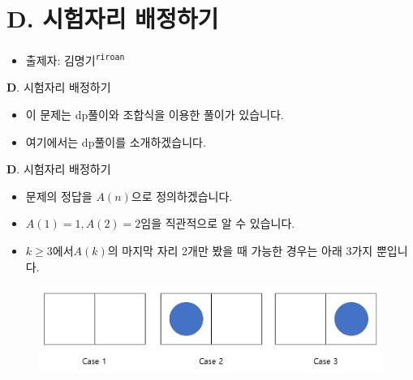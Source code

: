 \section{D. 시험자리 배정하기}

\begin{frame} %
    \begin{itemize}
        \item 출제자: 김명기\textsuperscript{\color{kupc-gray}\texttt{riroan}}
    \end{itemize}
\end{frame}

\begin{frame}{\textbf{D}. 시험자리 배정하기}

    \begin{itemize}
    	\item 이 문제는 dp풀이와 조합식을 이용한 풀이가 있습니다.
    	\item 여기에서는 dp풀이를 소개하겠습니다.
    \end{itemize}
    
\end{frame}


\begin{frame}{\textbf{D}. 시험자리 배정하기}
	
	\begin{itemize}
		\item 문제의 정답을 $A(n)$으로 정의하겠습니다.
		\item $A(1) = 1, A(2) = 2$임을 직관적으로 알 수 있습니다.
		\item $k \ge 3$에서$A(k)$의 마지막 자리 2개만 봤을 때 가능한 경우는 아래 3가지 뿐입니다.

	\end{itemize}
	\begin{figure}[h!]
		\centering
		\includegraphics[width=0.7\linewidth]{../images/set-examseats/1.png}
	\end{figure}
\end{frame}

